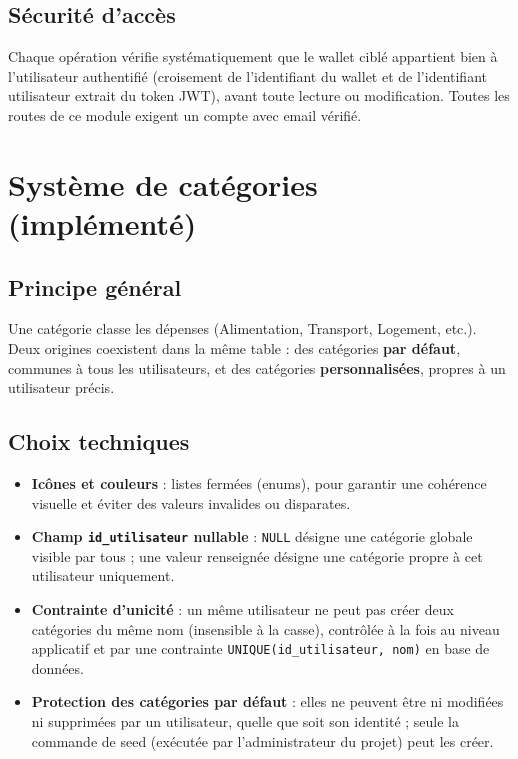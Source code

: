 \documentclass[11pt,a4paper]{article}
\begin{document}
\subsection{Sécurité d'accès}
Chaque opération vérifie systématiquement que le wallet ciblé appartient bien à l'utilisateur authentifié (croisement de l'identifiant du wallet et de l'identifiant utilisateur extrait du token JWT), avant toute lecture ou modification. Toutes les routes de ce module exigent un compte avec email vérifié.

\section{Système de catégories (implémenté)}

\subsection{Principe général}
Une catégorie classe les dépenses (Alimentation, Transport, Logement, etc.). Deux origines coexistent dans la même table : des catégories \textbf{par défaut}, communes à tous les utilisateurs, et des catégories \textbf{personnalisées}, propres à un utilisateur précis.

\subsection{Choix techniques}
\begin{itemize}[leftmargin=*]
    \item \textbf{Icônes et couleurs} : listes fermées (enums), pour garantir une cohérence visuelle et éviter des valeurs invalides ou disparates.
    \item \textbf{Champ \texttt{id\_utilisateur} nullable} : \texttt{NULL} désigne une catégorie globale visible par tous ; une valeur renseignée désigne une catégorie propre à cet utilisateur uniquement.
    \item \textbf{Contrainte d'unicité} : un même utilisateur ne peut pas créer deux catégories du même nom (insensible à la casse), contrôlée à la fois au niveau applicatif et par une contrainte \texttt{UNIQUE(id\_utilisateur, nom)} en base de données.
    \item \textbf{Protection des catégories par défaut} : elles ne peuvent être ni modifiées ni supprimées par un utilisateur, quelle que soit son identité ; seule la commande de seed (exécutée par l'administrateur du projet) peut les créer.
\end{itemize}
\end{document}
